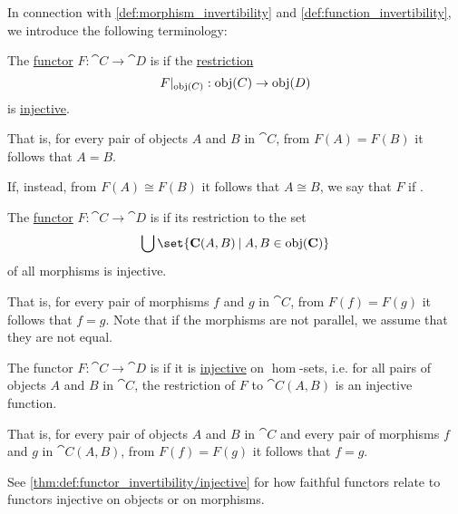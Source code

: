 \begin{definition}\label{def:functor_invertibility}
  In connection with \cref{def:morphism_invertibility} and \cref{def:function_invertibility}, we introduce the following terminology:
  \begin{thmenum}
     The \hyperref[def:functor]{functor} \( F: \cat{C} \to \cat{D} \) is  if the \hyperref[def:set_valued_map/restriction]{restriction}
    \begin{equation*}
      F\vert_{\operatorname{obj}(C)}: \operatorname{obj}(C) \to \operatorname{obj}(D)
    \end{equation*}
    is \hyperref[def:function_invertibility/injective]{injective}.

    That is, for every pair of objects \( A \) and \( B \) in \( \cat{C} \), from \( F(A) = F(B) \) it follows that \( A = B \).

    If, instead, from \( F(A) \cong F(B) \) it follows that \( A \cong B \), we say that \( F \) if .

     The \hyperref[def:functor]{functor} \( F: \cat{C} \to \cat{D} \) is  if its restriction to the set
    \begin{equation*}
      \bigcup\set{ \cat{C}(A, B) \given A, B \in \obj(\cat{C}) }
    \end{equation*}
    of all morphisms is injective.

    That is, for every pair of morphisms \( f \) and \( g \) in \( \cat{C} \), from \( F(f) = F(g) \) it follows that \( f = g \). Note that if the morphisms are not parallel, we assume that they are not equal.

     The functor \( F: \cat{C} \to \cat{D} \) is  if it is \hyperref[def:function_invertibility/injective]{injective} on \( \hom \)-sets, i.e. for all pairs of objects \( A \) and \( B \) in \( \cat{C} \), the restriction of \( F \) to \( \cat{C}(A, B) \) is an injective function.

    That is, for every pair of objects \( A \) and \( B \) in \( \cat{C} \) and every pair of morphisms \( f \) and \( g \) in \( \cat{C}(A, B) \), from \( F(f) = F(g) \) it follows that \( f = g \).

    See \cref{thm:def:functor_invertibility/injective} for how faithful functors relate to functors injective on objects or on morphisms.


\end{thmenum}
\end{definition}
